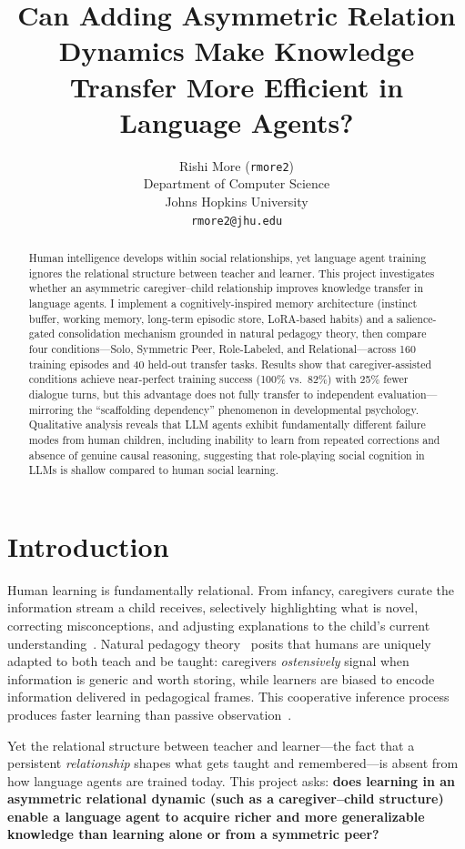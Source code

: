 \documentclass{article}
\title{Can Adding Asymmetric Relation Dynamics Make Knowledge Transfer More Efficient in Language Agents?}
\author{
  Rishi More (\texttt{rmore2}) \\
  Department of Computer Science\\
  Johns Hopkins University\\
  \texttt{rmore2@jhu.edu}
}
\begin{document}
\maketitle

\begin{abstract}
Human intelligence develops within social relationships, yet language agent training ignores the relational structure between teacher and learner. This project investigates whether an asymmetric caregiver--child relationship improves knowledge transfer in language agents. I implement a cognitively-inspired memory architecture (instinct buffer, working memory, long-term episodic store, LoRA-based habits) and a salience-gated consolidation mechanism grounded in natural pedagogy theory, then compare four conditions---Solo, Symmetric Peer, Role-Labeled, and Relational---across 160 training episodes and 40 held-out transfer tasks. Results show that caregiver-assisted conditions achieve near-perfect training success (100\% vs.\ 82\%) with 25\% fewer dialogue turns, but this advantage does not fully transfer to independent evaluation---mirroring the ``scaffolding dependency'' phenomenon in developmental psychology. Qualitative analysis reveals that LLM agents exhibit fundamentally different failure modes from human children, including inability to learn from repeated corrections and absence of genuine causal reasoning, suggesting that role-playing social cognition in LLMs is shallow compared to human social learning.
\end{abstract}

\section{Introduction}

Human learning is fundamentally relational. From infancy, caregivers curate the information stream a child receives, selectively highlighting what is novel, correcting misconceptions, and adjusting explanations to the child's current understanding~\citep{csibra2009natural, gweon2021inferential}. Natural pedagogy theory~\citep{csibra2009natural} posits that humans are uniquely adapted to both teach and be taught: caregivers \emph{ostensively} signal when information is generic and worth storing, while learners are biased to encode information delivered in pedagogical frames. This cooperative inference process~\citep{gweon2021inferential} produces faster learning than passive observation~\citep{ho2019cooperative}.

Yet the relational structure between teacher and learner---the fact that a persistent \emph{relationship} shapes what gets taught and remembered---is absent from how language agents are trained today. This project asks: \textbf{does learning in an asymmetric relational dynamic (such as a caregiver--child structure) enable a language agent to acquire richer and more generalizable knowledge than learning alone or from a symmetric peer?}
\end{document}
